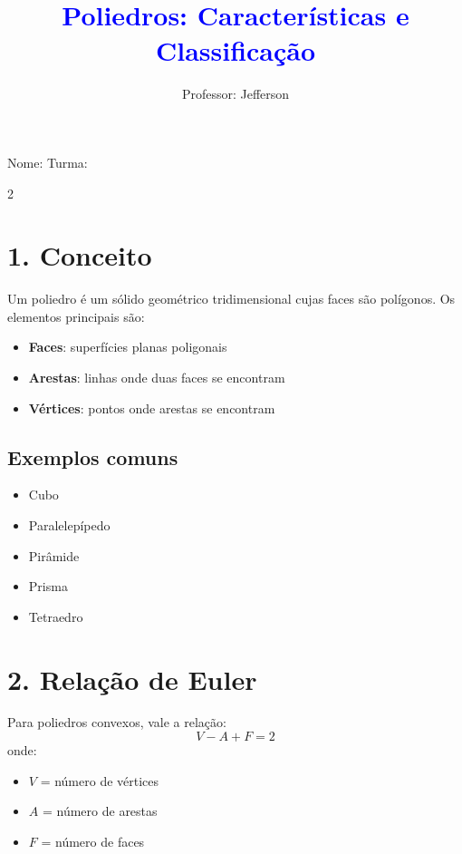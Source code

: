 \documentclass[11pt]{article}
\title{\textcolor{blue}{Poliedros: Características e Classificação}}
\author{Professor: Jefferson}
\date{}
\begin{document}
\maketitle
\vspace{-1cm}

\begin{center}
\large{Nome: \underline{\hspace{8cm}} \quad Turma: \underline{\hspace{3cm}}}
\end{center}

\begin{multicols}{2}

\section*{1. Conceito}
Um poliedro é um sólido geométrico tridimensional cujas faces são polígonos. Os elementos principais são:
\begin{itemize}
    \item \textbf{Faces}: superfícies planas poligonais
    \item \textbf{Arestas}: linhas onde duas faces se encontram
    \item \textbf{Vértices}: pontos onde arestas se encontram
\end{itemize}

\subsection*{Exemplos comuns}
\begin{itemize}
    \item Cubo
    \item Paralelepípedo
    \item Pirâmide
    \item Prisma
    \item Tetraedro
\end{itemize}

\section*{2. Relação de Euler}
Para poliedros convexos, vale a relação:
\[
V - A + F = 2
\]
onde:
\begin{itemize}
    \item $V$ = número de vértices
    \item $A$ = número de arestas
    \item $F$ = número de faces
\end{itemize}


\end{multicols}
\end{document}
